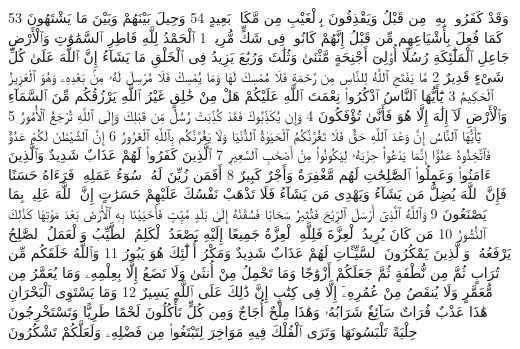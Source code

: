 {\tiny\colorbox{cl_aya}{53}} وَقَدْ كَفَرُوا۟ بِهِۦ مِن قَبْلُ وَيَقْذِفُونَ بِٱلْغَيْبِ مِن مَّكَانٍۭ بَعِيدٍ
{\tiny\colorbox{cl_aya}{54}} وَحِيلَ بَيْنَهُمْ وَبَيْنَ مَا يَشْتَهُونَ كَمَا فُعِلَ بِأَشْيَاعِهِم مِّن قَبْلُ إِنَّهُمْ كَانُوا۟ فِى شَكٍّ مُّرِيبٍۭ
{\tiny\colorbox{cl_aya}{1}} ٱلْحَمْدُ لِلَّهِ فَاطِرِ ٱلسَّمَٰوَٰتِ وَٱلْأَرْضِ جَاعِلِ ٱلْمَلَٰٓئِكَةِ رُسُلًا أُو۟لِىٓ أَجْنِحَةٍ مَّثْنَىٰ وَثُلَٰثَ وَرُبَٰعَ يَزِيدُ فِى ٱلْخَلْقِ مَا يَشَآءُ إِنَّ ٱللَّهَ عَلَىٰ كُلِّ شَىْءٍ قَدِيرٌ
{\tiny\colorbox{cl_aya}{2}} مَّا يَفْتَحِ ٱللَّهُ لِلنَّاسِ مِن رَّحْمَةٍ فَلَا مُمْسِكَ لَهَا وَمَا يُمْسِكْ فَلَا مُرْسِلَ لَهُۥ مِنۢ بَعْدِهِۦ وَهُوَ ٱلْعَزِيزُ ٱلْحَكِيمُ
{\tiny\colorbox{cl_aya}{3}} يَٰٓأَيُّهَا ٱلنَّاسُ ٱذْكُرُوا۟ نِعْمَتَ ٱللَّهِ عَلَيْكُمْ هَلْ مِنْ خَٰلِقٍ غَيْرُ ٱللَّهِ يَرْزُقُكُم مِّنَ ٱلسَّمَآءِ وَٱلْأَرْضِ لَآ إِلَٰهَ إِلَّا هُوَ فَأَنَّىٰ تُؤْفَكُونَ
{\tiny\colorbox{cl_aya}{4}} وَإِن يُكَذِّبُوكَ فَقَدْ كُذِّبَتْ رُسُلٌ مِّن قَبْلِكَ وَإِلَى ٱللَّهِ تُرْجَعُ ٱلْأُمُورُ
{\tiny\colorbox{cl_aya}{5}} يَٰٓأَيُّهَا ٱلنَّاسُ إِنَّ وَعْدَ ٱللَّهِ حَقٌّ فَلَا تَغُرَّنَّكُمُ ٱلْحَيَوٰةُ ٱلدُّنْيَا وَلَا يَغُرَّنَّكُم بِٱللَّهِ ٱلْغَرُورُ
{\tiny\colorbox{cl_aya}{6}} إِنَّ ٱلشَّيْطَٰنَ لَكُمْ عَدُوٌّ فَٱتَّخِذُوهُ عَدُوًّا إِنَّمَا يَدْعُوا۟ حِزْبَهُۥ لِيَكُونُوا۟ مِنْ أَصْحَٰبِ ٱلسَّعِيرِ
{\tiny\colorbox{cl_aya}{7}} ٱلَّذِينَ كَفَرُوا۟ لَهُمْ عَذَابٌ شَدِيدٌ وَٱلَّذِينَ ءَامَنُوا۟ وَعَمِلُوا۟ ٱلصَّٰلِحَٰتِ لَهُم مَّغْفِرَةٌ وَأَجْرٌ كَبِيرٌ
{\tiny\colorbox{cl_aya}{8}} أَفَمَن زُيِّنَ لَهُۥ سُوٓءُ عَمَلِهِۦ فَرَءَاهُ حَسَنًا فَإِنَّ ٱللَّهَ يُضِلُّ مَن يَشَآءُ وَيَهْدِى مَن يَشَآءُ فَلَا تَذْهَبْ نَفْسُكَ عَلَيْهِمْ حَسَرَٰتٍ إِنَّ ٱللَّهَ عَلِيمٌۢ بِمَا يَصْنَعُونَ
{\tiny\colorbox{cl_aya}{9}} وَٱللَّهُ ٱلَّذِىٓ أَرْسَلَ ٱلرِّيَٰحَ فَتُثِيرُ سَحَابًا فَسُقْنَٰهُ إِلَىٰ بَلَدٍ مَّيِّتٍ فَأَحْيَيْنَا بِهِ ٱلْأَرْضَ بَعْدَ مَوْتِهَا كَذَٰلِكَ ٱلنُّشُورُ
{\tiny\colorbox{cl_aya}{10}} مَن كَانَ يُرِيدُ ٱلْعِزَّةَ فَلِلَّهِ ٱلْعِزَّةُ جَمِيعًا إِلَيْهِ يَصْعَدُ ٱلْكَلِمُ ٱلطَّيِّبُ وَٱلْعَمَلُ ٱلصَّٰلِحُ يَرْفَعُهُۥ وَٱلَّذِينَ يَمْكُرُونَ ٱلسَّيِّـَٔاتِ لَهُمْ عَذَابٌ شَدِيدٌ وَمَكْرُ أُو۟لَٰٓئِكَ هُوَ يَبُورُ
{\tiny\colorbox{cl_aya}{11}} وَٱللَّهُ خَلَقَكُم مِّن تُرَابٍ ثُمَّ مِن نُّطْفَةٍ ثُمَّ جَعَلَكُمْ أَزْوَٰجًا وَمَا تَحْمِلُ مِنْ أُنثَىٰ وَلَا تَضَعُ إِلَّا بِعِلْمِهِۦ وَمَا يُعَمَّرُ مِن مُّعَمَّرٍ وَلَا يُنقَصُ مِنْ عُمُرِهِۦٓ إِلَّا فِى كِتَٰبٍ إِنَّ ذَٰلِكَ عَلَى ٱللَّهِ يَسِيرٌ
{\tiny\colorbox{cl_aya}{12}} وَمَا يَسْتَوِى ٱلْبَحْرَانِ هَٰذَا عَذْبٌ فُرَاتٌ سَآئِغٌ شَرَابُهُۥ وَهَٰذَا مِلْحٌ أُجَاجٌ وَمِن كُلٍّ تَأْكُلُونَ لَحْمًا طَرِيًّا وَتَسْتَخْرِجُونَ حِلْيَةً تَلْبَسُونَهَا وَتَرَى ٱلْفُلْكَ فِيهِ مَوَاخِرَ لِتَبْتَغُوا۟ مِن فَضْلِهِۦ وَلَعَلَّكُمْ تَشْكُرُونَ
